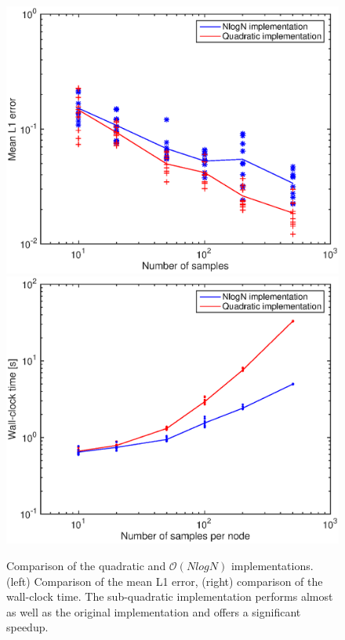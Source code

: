 \begin{figure}[!h]
\center
\includegraphics[width=.51\textwidth]{figures/epbp/errCompNLOGN}
\hspace*{-.7cm}
\includegraphics[width=.51\textwidth]{figures/epbp/timeCompNLOGN}
\caption{\label{figCompNLOGN}Comparison of the quadratic and $\mathcal O(N log N )$ implementations. (left) Comparison of the mean L1 error, (right) comparison of the wall-clock time. The sub-quadratic implementation performs almost as well as the original implementation and offers a significant speedup.}


\end{figure}

